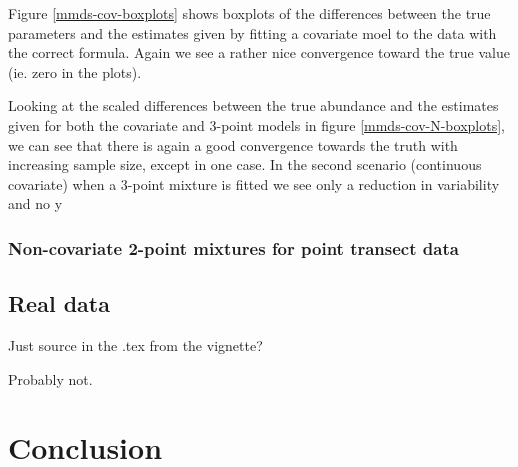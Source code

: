 Figure \ref{mmds-cov-boxplots} shows boxplots of the differences between the true parameters and the estimates given by fitting a covariate moel to the data with the correct formula. Again we see a rather nice convergence toward the true value (ie. zero in the plots).

Looking at the scaled differences between the true abundance and the estimates given for both the covariate and 3-point models in figure \ref{mmds-cov-N-boxplots}, we can see that there is again a good convergence towards the truth with increasing sample size, except in one case. In the second scenario (continuous covariate) when a 3-point mixture is fitted we see only a reduction in variability and no y



\subsubsection{Non-covariate 2-point mixtures for point transect data}



\subsection{Real data}

Just source in the .tex from the vignette?

Probably not.


\section{Conclusion}


%
%

